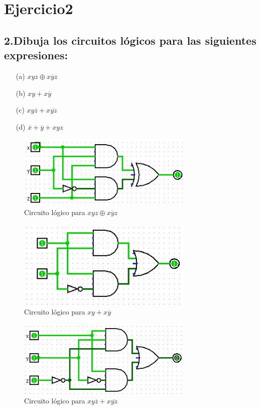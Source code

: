 \chapter*{Ejercicio2}

\section{2.Dibuja los circuitos lógicos para las siguientes expresiones:}

\begin{enumerate}
    \item[(a)] $xyz \oplus x\overline{y}z$
    \item[(b)] $xy + x\overline{y}$
    \item[(c)] $xy\overline{z} + x\overline{yz}$
    \item[(d)] $\overline{x} + \overline{y} + xyz$
    
\end{enumerate}
 \begin{figure}[hbt!]
    \centering
    \includegraphics[width=0.75\textwidth]{recursos/Ejercicio2/circuito_a.png}
    \caption{Circuito lógico para $xyz \oplus x\overline{y}z$}
\end{figure}

\begin{figure}[hbt!]
    \centering
    \includegraphics[width=0.75\textwidth]{recursos/Ejercicio2/circuito_b.png}
    \caption{Circuito lógico para $xy + x\overline{y}$}
\end{figure}

\begin{figure}[hbt!]
    \centering
    \includegraphics[width=0.75\textwidth]{recursos/Ejercicio2/circuito_c.png   }
    \caption{Circuito lógico para $xy\overline{z} + x\overline{yz}$}
\end{figure}


